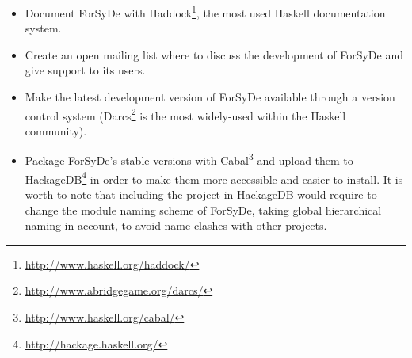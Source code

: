 \begin{itemize}
  \begin{itemize}
  \item Document ForSyDe with
    Haddock\footnote{\url{http://www.haskell.org/haddock/}}, the most
    used Haskell documentation system.
  \item Create an open mailing list where to discuss the development
    of ForSyDe and give support to its users.
  \item Make the latest development version of ForSyDe available
    through a version control system
    (Darcs\footnote{\url{http://www.abridgegame.org/darcs/}} is the most
    widely-used within the Haskell community).
  \item Package ForSyDe's stable versions with
    Cabal\footnote{\url{http://www.haskell.org/cabal/}} and upload
    them to
    HackageDB\footnote{\url{http://hackage.haskell.org/}} in
    order to make them more accessible and easier to install. It is
    worth to note that including the project in HackageDB would
    require to change the module naming scheme of ForSyDe, taking
    global hierarchical naming in account, to avoid name clashes with
    other projects.
    
\end{itemize}

\end{itemize}
